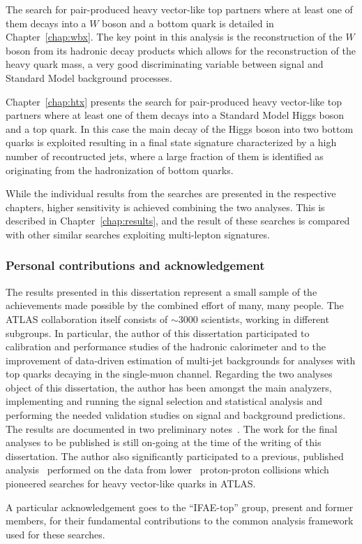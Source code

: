 The search for pair-produced heavy vector-like top partners
where at least one of them decays into a $W$ boson and a bottom
quark is detailed in Chapter~\ref{chap:wbx}. The key point in
this analysis is the reconstruction of the $W$ boson from its
hadronic decay products which allows for the reconstruction
of the heavy quark mass, a very good discriminating variable between
signal and Standard Model background processes.

Chapter~\ref{chap:htx} presents the search for 
pair-produced heavy vector-like top partners
where at least one of them decays into a Standard Model Higgs
boson and a top quark. In this case the main decay of the Higgs
boson into two bottom quarks is exploited resulting in a
final state signature characterized by a high number of recontructed
jets, where a large fraction of them is identified as originating
from the hadronization of bottom quarks.

While the individual results from the searches
are presented in the respective chapters, higher
sensitivity is achieved combining the two analyses.
This is described in Chapter~\ref{chap:results},
and the result of these searches is compared with
other similar searches exploiting multi-lepton signatures.


\subsubsection*{Personal contributions and acknowledgement}

The results presented in this dissertation represent
a small sample of the achievements made possible by
the combined effort of many, many people. The ATLAS
collaboration itself consists of $\sim$3000 scientists,
working in different subgroups. In particular,
the author of this dissertation participated to calibration
and performance studies of the hadronic calorimeter
and to the improvement of data-driven estimation of
multi-jet backgrounds for analyses with top quarks 
decaying in the single-muon channel. Regarding
the two analyses object of this dissertation, the author
has been amongst the main analyzers, implementing and
running the signal selection and statistical analysis and
performing the needed validation studies 
on signal and background predictions. %
The results are documented in two preliminary 
notes~\cite{ATLAS-CONF-2013-060,ATLAS-CONF-2013-018}.
The work for the final analyses to be published is still on-going at
the time of the writing of this dissertation.
The author also significantly participated to a previous,
published analysis~\cite{ATLAS:2012qe}
performed on the data from lower \cme\ 
proton-proton collisions which pioneered searches for
heavy vector-like quarks in ATLAS.

A particular acknowledgement goes to the ``IFAE-top''
group, present and former members, for their fundamental
contributions to the common analysis framework used
for these searches.
